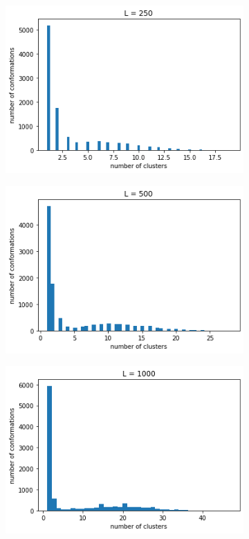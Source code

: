 \begin{figure}[H]
	\centering
	\begin{subfigure}[t]{0.3\textwidth} 
		\includegraphics[width=\textwidth]{../images/clusters_count_L250.png} 
	\end{subfigure}
	\begin{subfigure}[t]{0.3\textwidth} 
		\includegraphics[width=\textwidth]{../images/clusters_count_L500.png} 
	\end{subfigure}
	\begin{subfigure}[t]{0.3\textwidth} 
		\includegraphics[width=\textwidth]{../images/clusters_count_L1000.png} 

\end{subfigure}
\end{figure}

